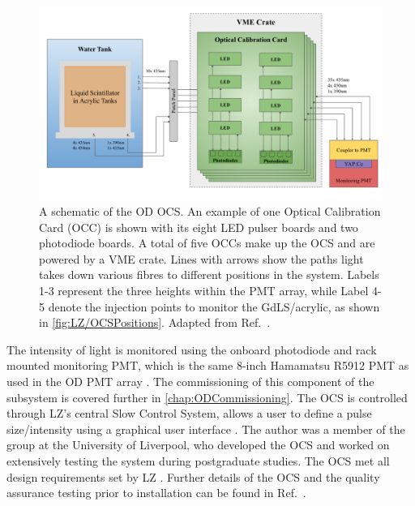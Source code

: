 \begin{figure}[!ht]
    \centering
    \includegraphics[width=0.9\linewidth]{figures/LZ/OCSSchematics.pdf}
    \caption{A schematic of the OD OCS. An example of one Optical Calibration Card (OCC) is shown with its eight LED pulser boards and two photodiode boards. A total of five OCCs make up the OCS and are powered by a VME crate. Lines with arrows show the paths light takes down various fibres to different positions in the system. Labels 1-3 represent the three heights within the PMT array, while Label 4-5 denote the injection points to monitor the GdLS/acrylic, as shown in \autoref{fig:LZ/OCSPositions}. Adapted from Ref.~\cite{Turner:2021qvi,LZ:2024bsz}.}
    \label{fig:LZ/OCSSchematic}
\end{figure}
The intensity of light is monitored using the onboard photodiode and rack mounted monitoring PMT, which is the same 8-inch Hamamatsu R5912 PMT as used in the OD PMT array \cite{Turner:2021qvi}. The commissioning of this component of the subsystem is covered further in \autoref{chap:ODCommissioning}. The OCS is controlled through LZ's central Slow Control System, allows a user to define a pulse size/intensity using a graphical user interface \cite{hbirch:thesis}.
The author was a member of the group at the University of Liverpool, who developed the OCS and worked on extensively testing the system during postgraduate studies. The OCS met all design requirements set by LZ \cite{Turner:2021qvi}. Further details of the OCS and the quality assurance testing prior to installation can be found in Ref.~\cite{hbirch:thesis,Turner:2021qvi}.
